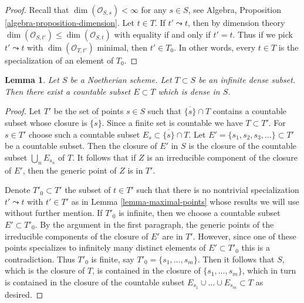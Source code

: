 \documentclass{stacks-project}
\theoremstyle{plain}
\newtheorem{lemma}[subsection]{Lemma}
\theoremstyle{definition}
\theoremstyle{remark}
\numberwithin{equation}{subsection}
\begin{document}
\begin{proof}
Recall that $\dim(\mathcal{O}_{S, s}) < \infty$ for any $s \in S$, see
Algebra, Proposition \ref{algebra-proposition-dimension}. Let $t \in T$.
If $t' \leadsto t$, then by dimension theory
$\dim(\mathcal{O}_{S, t'}) \leq \dim(\mathcal{O}_{S, t})$
with equality if and only if $t' = t$. Thus if we pick $t' \leadsto t$
with $\dim(\mathcal{O}_{T, t'})$ minimal, then $t' \in T_0$.
In other words, 
every $t \in T$ is the specialization of an element of $T_0$.
\end{proof}

\begin{lemma}
\label{lemma-countable-dense-subset}
Let $S$ be a Noetherian scheme. Let $T \subset S$ be an infinite dense subset.
Then there exist a countable subset $E \subset T$ which is dense in $S$.
\end{lemma}

\begin{proof}
Let $T'$ be the set of points $s \in S$ such that $\overline{\{s\}} \cap T$
contains a countable subset whose closure is $\overline{\{s\}}$.
Since a finite set is countable we have $T \subset T'$.
For $s \in T'$ choose such a countable subset
$E_s \subset \overline{\{s\}} \cap T$.
Let $E' = \{s_1, s_2, s_3, \ldots\} \subset T'$
be a countable subset. Then the closure of $E'$ in $S$ is the
closure of the countable subset $\bigcup_n E_{s_n}$ of $T$.
It follows that if $Z$
is an irreducible component of the closure of $E'$, then the generic
point of $Z$ is in $T'$.

\medskip\noindent
Denote $T'_0 \subset T'$ the subset of $t \in T'$ such that
there is no nontrivial specialization $t' \leadsto t$ with $t' \in T'$
as in Lemma \ref{lemma-maximal-points} whose results we will use
without further mention. If $T'_0$ is infinite, then we choose a
countable subset $E' \subset T'_0$. By the argument in the first
paragraph, the generic points of the irreducible components of the
closure of $E'$ are in $T'$. However, since one of these points specializes to
infinitely many distinct elements of $E' \subset T'_0$
this is a contradiction. Thus $T'_0$ is finite, say
$T'_0 = \{s_1, \ldots, s_m\}$. Then it follows that $S$, which is
the closure of $T$, is contained in the closure of
$\{s_1, \ldots, s_m\}$, which in turn is contained in the closure
of the countable subset $E_{s_1} \cup \ldots \cup E_{s_m} \subset T$
as desired.
\end{proof}
\end{document}
